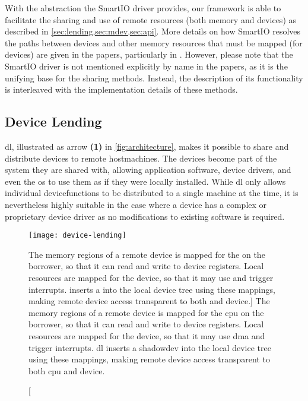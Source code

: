 With the abstraction the SmartIO driver provides, our framework is able to facilitate the sharing and use of remote resources (both memory and devices) as described in \cref{sec:lending,sec:mdev,sec:api}.
%
More details on how SmartIO resolves the paths between devices and other memory resources that must be mapped (for devices) are given in the papers, particularly in .
%
However, please note that the SmartIO driver is not mentioned explicitly by name in the papers, as it is the unifying base for the sharing methods.
%
Instead, the description of its functionality is interleaved with the implementation details of these methods.



\subsection{Device Lending}\label{sec:lending}
\Gls{dl}, illustrated as arrow \textbf{(1)} in \cref{fig:architecture}, makes it possible to share and distribute devices to remote \glspl{hostmachine}.
%
The devices become part of the system they are shared with, allowing application software, device drivers, and even the \gls{os} to use them as if they were locally installed.
%
While \gls{dl} only allows individual \glspl{devicefunction} to be distributed to a single machine at the time, it is nevertheless highly suitable in the case where a device has a complex or proprietary device driver as no modifications to existing software is required.



\begin{figure}
    \centering
    \texttt{[image: device-lending]}
    \caption
    [The memory regions of a remote device is mapped for the  on the borrower, so that it can read and write to device registers. Local resources are mapped for the device, so that it may use  and trigger interrupts.  inserts a  into the local device tree using these mappings, making remote device access transparent to both  and device.]
    {The memory regions of a remote device is mapped for the \gls{cpu} on the borrower, so that it can read and write to device registers. Local resources are mapped for the device, so that it may use \gls{dma} and trigger interrupts. \Gls{dl} inserts a \gls{shadowdev} into the local device tree using these mappings, making remote device access transparent to both \gls{cpu} and device.}
    \label{fig:device-lending}
\end{figure}

